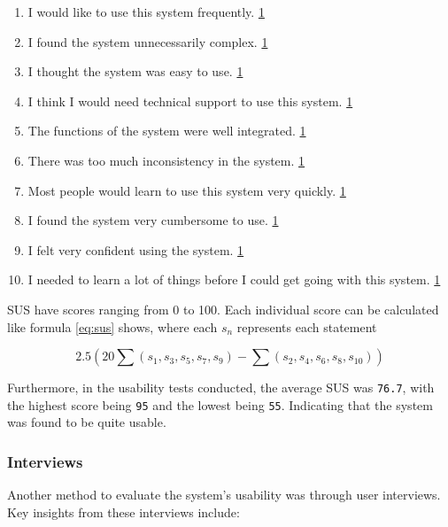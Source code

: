 \begin{enumerate}[label=\textbf{\arabic*.}]
    \item I would like to use this system frequently. \hfill \underline{1    }
    \item I found the system unnecessarily complex. \hfill \underline{1    }
    \item I thought the system was easy to use. \hfill \underline{1    }
    \item I think I would need technical support to use this system. \hfill \underline{1    }
    \item The functions of the system were well integrated. \hfill \underline{1    }
    \item There was too much inconsistency in the system. \hfill \underline{1    }
    \item Most people would learn to use this system very quickly. \hfill \underline{1    }
    \item I found the system very cumbersome to use. \hfill \underline{1    }
    \item I felt very confident using the system. \hfill \underline{1    }
    \item I needed to learn a lot of things before I could get going with this system. \hfill \underline{1    }
\end{enumerate}

SUS have scores ranging from 0 to 100. Each individual score can be calculated like formula \ref{eq:sus} shows, where each $s_n$ represents each statement

\begin{equation}
    2.5 \left(20 \sum(s_1,s_3,s_5,s_7,s_9) - \sum(s_2,s_4,s_6,s_8,s_{10})\right) \label{eq:sus}
\end{equation}

Furthermore, in the usability tests conducted, the average SUS was \verb|76.7|, with the highest score being \verb|95| and the lowest being \verb|55|. Indicating that the system was found to be quite usable.


\subsubsection{Interviews}
Another method to evaluate the system's usability was through user interviews. Key insights from these interviews include:

